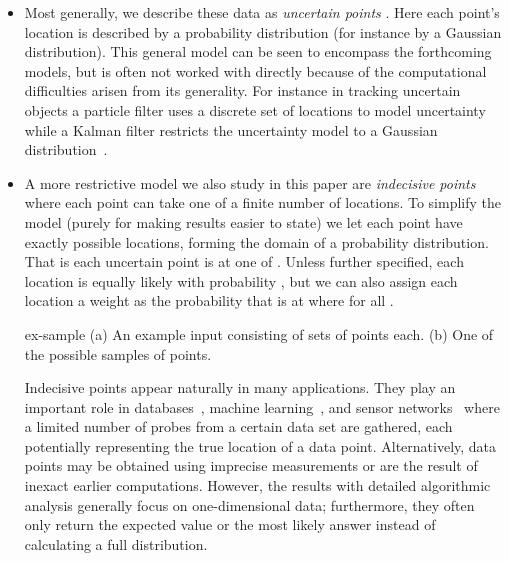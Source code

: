 \documentclass{journal}
\begin{document}
\begin{itemize}
\item 
Most generally, we describe these data as \emph{uncertain points} .  Here each point's location is described by a probability distribution  (for instance by a Gaussian distribution).  This general model can be seen to encompass the forthcoming models, but is often not worked with directly because of the computational difficulties arisen from its generality.  For instance in tracking uncertain objects a particle filter uses a discrete set of locations to model uncertainty~\cite{MDFW00} while a Kalman filter restricts the uncertainty model to a Gaussian distribution~\cite{Kal60}.  

\item 
A more restrictive model we also study in this paper are \emph{indecisive points} where each point can take one of a finite number of locations.  To simplify the model (purely for making results easier to state) we let each point have exactly  possible locations, forming the domain of a probability distribution.  That is each uncertain point  is at one of .  Unless further specified, each location is equally likely with probability , but we can also assign each location a weight  as the probability that  is at  where  for all .  

 {ex-sample} {(a) An example input consisting of  sets of  points each. (b) One of the  possible samples of  points.}

Indecisive points appear naturally in many applications. They play an important role in databases~\cite{DS04,ABSHNSW06,CM08,CG09,TCXNKP05,ACTY09,CLY09}, machine learning~\cite{BZ04}, and sensor networks~\cite{ZC04} where a limited number of probes from a certain data set are gathered, each potentially representing the true location of a data point.  Alternatively, data points may be obtained using imprecise measurements or are the result of inexact earlier computations.
However, the results with detailed algorithmic analysis generally focus on one-dimensional data; furthermore, they often only return the expected value or the most likely answer instead of calculating a full distribution.  





\end{itemize}
\end{document}
